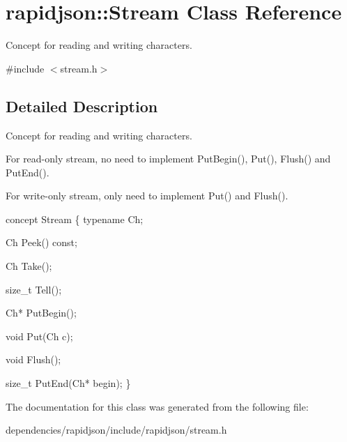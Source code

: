 \hypertarget{classrapidjson_1_1_stream}{}\section{rapidjson\+:\+:Stream Class Reference}
\label{classrapidjson_1_1_stream}


Concept for reading and writing characters.  




{\ttfamily \#include $<$stream.\+h$>$}



\subsection{Detailed Description}
Concept for reading and writing characters. 

For read-\/only stream, no need to implement Put\+Begin(), Put(), Flush() and Put\+End().

For write-\/only stream, only need to implement Put() and Flush().


\begin{DoxyCode}
concept Stream \{
    \textcolor{keyword}{typename} Ch;    

    Ch Peek() \textcolor{keyword}{const};

    Ch Take();

    \textcolor{keywordtype}{size\_t} Tell();

    Ch* PutBegin();

    \textcolor{keywordtype}{void} Put(Ch c);

    \textcolor{keywordtype}{void} Flush();

    \textcolor{keywordtype}{size\_t} PutEnd(Ch* begin);
\}
\end{DoxyCode}
 

The documentation for this class was generated from the following file\+:\begin{DoxyCompactItemize}
\item 
dependencies/rapidjson/include/rapidjson/stream.\+h\end{DoxyCompactItemize}
